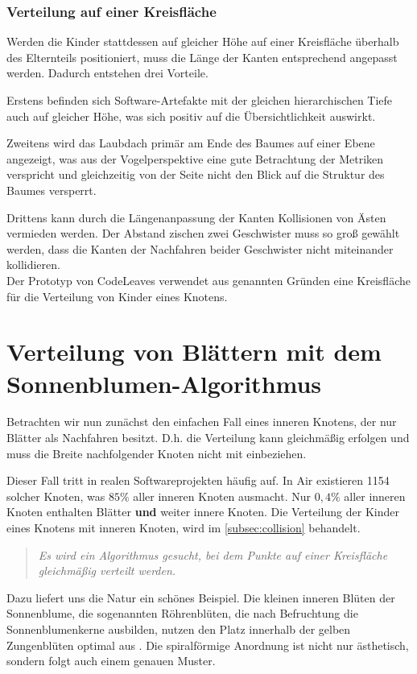 \subsubsection*{Verteilung auf einer Kreisfläche}
Werden die Kinder stattdessen auf gleicher Höhe auf einer Kreisfläche überhalb des Elternteils positioniert, muss die Länge der Kanten entsprechend angepasst werden. Dadurch entstehen drei Vorteile.

Erstens befinden sich Software-Artefakte mit der gleichen hierarchischen Tiefe auch auf gleicher Höhe, was sich positiv auf die Übersichtlichkeit auswirkt.

Zweitens wird das Laubdach primär am Ende des Baumes auf einer Ebene angezeigt, was aus der Vogelperspektive eine gute Betrachtung der Metriken verspricht und gleichzeitig von der Seite nicht den Blick auf die Struktur des Baumes versperrt.

Drittens kann durch die Längenanpassung der Kanten Kollisionen von Ästen vermieden werden. Der Abstand zischen zwei Geschwister muss so groß gewählt werden, dass die Kanten der Nachfahren beider Geschwister nicht miteinander kollidieren.\\

Der Prototyp von CodeLeaves verwendet aus genannten Gründen eine Kreisfläche für die Verteilung von Kinder eines Knotens.

\section{Verteilung von Blättern mit dem Sonnenblumen-Algorithmus}
\label{sec:sunflower}

Betrachten wir nun zunächst den einfachen Fall eines inneren Knotens, der nur Blätter als Nachfahren besitzt. D.h. die Verteilung kann gleichmäßig erfolgen und muss die Breite nachfolgender Knoten nicht mit einbeziehen.

Dieser Fall tritt in realen Softwareprojekten häufig auf. In Air existieren 1154 solcher Knoten, was $85\%$ aller inneren Knoten ausmacht. Nur $0,4\%$ aller inneren Knoten enthalten Blätter \textbf{und} weiter innere Knoten. Die Verteilung der Kinder eines Knotens mit inneren Knoten, wird im \ref{subsec:collision} behandelt.

\begin{quote}
  \textit{Es wird ein Algorithmus gesucht, bei dem Punkte auf einer Kreisfläche gleichmäßig verteilt werden.}
\end{quote}

Dazu liefert uns die Natur ein schönes Beispiel. Die kleinen inneren Blüten der Sonnenblume, die sogenannten Röhrenblüten, die nach Befruchtung die Sonnenblumenkerne ausbilden, nutzen den Platz innerhalb der gelben Zungenblüten optimal aus \cite{zimmermann2017sonnenblume}. Die spiralförmige Anordnung ist nicht nur ästhetisch, sondern folgt auch einem genauen Muster.

